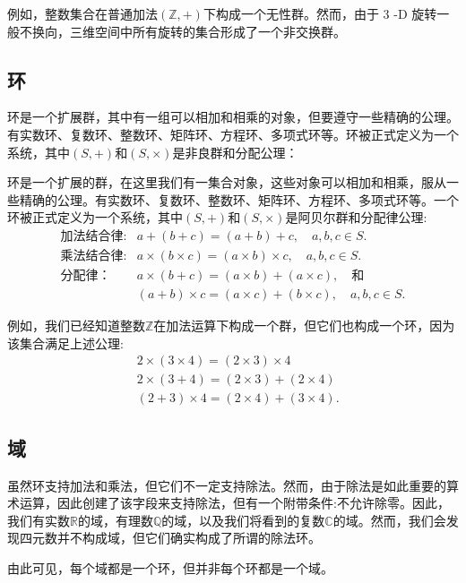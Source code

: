 例如，整数集合在普通加法$(\mathbb{Z},+)$下构成一个无性群。然而，由于 3 -D 旋转一般不换向，三维空间中所有旋转的集合形成了一个非交换群。

\subsection{环}
环是一个扩展群，其中有一组可以相加和相乘的对象，但要遵守一些精确的公理。有实数环、复数环、整数环、矩阵环、方程环、多项式环等。环被正式定义为一个系统，其中$(S,+)$和$(S,\times)$是非良群和分配公理：

环是一个扩展的群，在这里我们有一集合对象，这些对象可以相加和相乘，服从一些精确的公理。有实数环、复数环、整数环、矩阵环、方程环、多项式环等。一个环被正式定义为一个系统，其中$(S,+)$和$(S, \times)$是阿贝尔群和分配律公理:
$$
    \begin{array}{rlr}
\text{加法结合律:} &a+(b+c)=(a+b)+c, \quad a, b, c \in S.\\
\text{乘法结合律:} &a \times(b \times c)=(a \times b) \times c, \quad a, b, c \in S.\\
\text{分配律：} & a \times(b+c)=(a \times b)+(a \times c), \quad \text{和} \\
 & (a+b) \times c=(a \times c)+(b \times c), \quad a, b, c \in S.
    \end{array}
$$

例如，我们已经知道整数$\mathbb{Z}$在加法运算下构成一个群，但它们也构成一个环，因为该集合满足上述公理:
$$
    \begin{array}{rlr}
         & 2 \times(3 \times 4)=(2 \times 3) \times 4 \\
         & 2 \times(3+4)=(2 \times 3)+(2 \times 4)    \\
         & (2+3) \times 4=(2 \times 4)+(3 \times 4) .
    \end{array}
$$

\subsection{域}
虽然环支持加法和乘法，但它们不一定支持除法。然而，由于除法是如此重要的算术运算，因此创建了该字段来支持除法，但有一个附带条件:不允许除零。因此，我们有实数$\mathbb{R}$的域，有理数$\mathbb{Q}$的域，以及我们将看到的复数$\mathbb{C}$的域。然而，我们会发现四元数并不构成域，但它们确实构成了所谓的除法环。

由此可见，每个域都是一个环，但并非每个环都是一个域。

